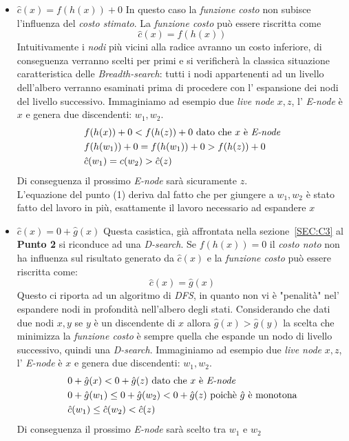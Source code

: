\documentclass[a4paper]{article}
\begin{document}
\begin{itemize}
	\item $\hat c(x) = f(h(x)) + 0$ In questo caso la \textit{funzione costo} non subisce l'influenza del \textit{costo stimato}.
		La \textit{funzione costo} può essere riscritta come $$\hat c(x) = f(h(x))$$
		Intuitivamente i \textit{nodi} più vicini alla radice avranno un costo inferiore, di conseguenza verranno scelti per primi e si verificherà la classica situazione caratteristica delle \textit{Breadth-search}: tutti i nodi appartenenti ad un livello dell'albero verranno esaminati prima di procedere con l' espansione dei nodi del livello successivo.
Immaginiamo ad esempio due \textit{live node} $x,z$, l' \textit{E-node} è $x$ e genera due discendenti: $w_1, w_2$.
                \begin{align}
                        &f(h(x)) + 0 < f(h(z)) + 0 \text{ dato che $x$ è \textit{E-node}} \notag \\
                        &f(h(w_1)) + 0 = f(h(w_1)) + 0 > f(h(z)) + 0 \\
                        &\hat c(w_1) = c(w_2) > \hat c(z) \notag
                \end{align}
Di conseguenza il prossimo \textit{E-node} sarà sicuramente $z$.\\
L'equazione del punto (1) deriva dal fatto che per giungere a $w_1,w_2$ è stato fatto del lavoro in più, esattamente il lavoro necessario ad espandere $x$

	\item $\hat c(x) = 0 + \hat g(x)$ Questa casistica, già affrontata nella sezione~\ref{SEC:C3} al \textbf{Punto 2} si riconduce ad una \textit{D-search}.
		Se $f(h(x)) =0$ il \textit{costo noto} non ha influenza sul risultato generato da $\hat c(x)$ e la \textit{funzione costo} può essere riscritta come: $$\hat c(x) = \hat g(x)$$
Questo ci riporta ad un algoritmo di \textit{DFS}, in quanto non vi è "penalità" nel' espandere nodi in profondità nell'albero degli stati.
Considerando che dati due nodi $x,y$ se $y$ è un discendente di $x$ allora $\hat g(x) > \hat g(y)$ la scelta che minimizza la \textit{funzione costo} è sempre quella che espande un nodo di livello successivo, quindi una \textit{D-search}.
Immaginiamo ad esempio due \textit{live node} $x,z$, l' \textit{E-node} è $x$ e genera due discendenti: $w_1, w_2$.
                \begin{align}
                        &0 + \hat g(x) < 0 + \hat g(z) \text{ dato che $x$ è \textit{E-node}} \notag \\
                        &0 + \hat g(w_1) \leq 0 + \hat g(w_2) < 0 + \hat g(z) \text{ poichè $\hat g$ è monotona} \notag\\
                        &\hat c(w_1) \leq \hat c(w_2) < \hat c(z) \notag
                \end{align}
Di conseguenza il prossimo \textit{E-node} sarà scelto tra $w_1$ e $w_2$

\end{itemize}
\end{document}
